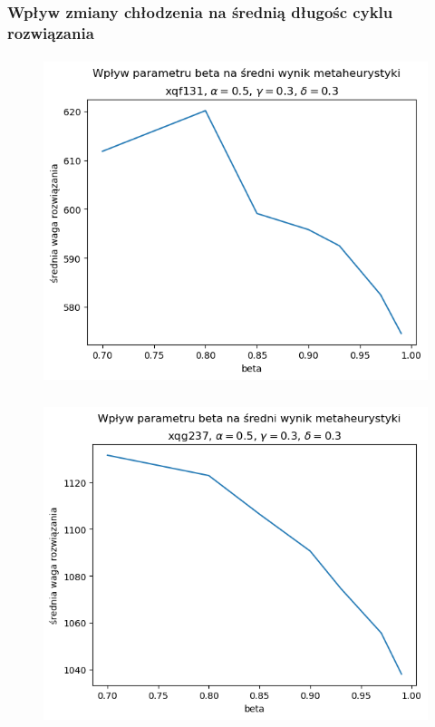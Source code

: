 \documentclass{article}
\begin{document}
\subsubsection{Wpływ zmiany chłodzenia na średnią długośc cyklu rozwiązania}
    \begin{figure}[h!]
        \centering
        \includegraphics[height=9.5cm]{../../plots/sa-tuning-beta-avg-xqf131.png}
    \end{figure}

    \begin{figure}[h!]
        \centering
        \includegraphics[height=9.5cm]{../../plots/sa-tuning-beta-avg-xqg237.png}
    \end{figure}

\newpage
\end{document}
